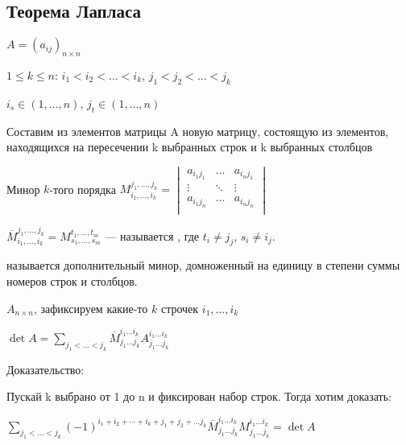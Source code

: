 \subsection{Теорема Лапласа}

\(A =(a_{ij})_{n \times n}\)

\(1 \leq k \leq n\): \(i_1 < i_2 < \ldots < i_k\), \(j_1 < j_2 < \ldots < j_k\)

\(i_s \in (1, \ldots, n)\), \(j_t \in (1, \ldots, n)\)

Составим из элементов матрицы A новую матрицу, состоящую из элементов, находящихся на пересечении k выбранных строк и k выбранных столбцов

Минор \(k\)-того порядка \(M_{i_1, \ldots, i_k}^{j_1, \ldots, j_k} =
\begin{vmatrix}
    a_{i_1 j_1} & \ldots & a_{i_n j_1} \\
    \vdots      & \ddots & \vdots      \\
    a_{i_1 j_n} & \ldots & a_{i_n j_n} \\
\end{vmatrix}\)

\(\overline{M}_{i_1, \ldots, i_k}^{j_1, \ldots, j_k} = M_{s_1, \ldots, s_m}^{t_1, \ldots, t_m}\) --- называется , где $t_i \neq j_j$, $s_i\neq i_j$.

 называется дополнительный минор, домноженный на единицу в степени суммы номеров строк и столбцов.


\(A_{n\times n }\), зафиксируем какие-то $k$ строчек $i_1,\ldots, i_k$

\(\det A = \sum\limits_{j_1<\ldots<j_k} \overline{M}_{j_1\ldots j_k}^{i_1\ldots i_k} A_{j_1\ldots j_k}^{i_1\ldots i_k}\)

Доказательство:

Пускай k выбрано от 1 до n и фиксирован набор строк. Тогда хотим доказать:

\(\sum\limits_{j_1<\ldots<j_k}(-1)^{i_1+i_2+ \cdots +i_k+ j_1 +j_2 + \ldots j_k} \overline{M}_{j_1\ldots j_k}^{i_1\ldots i_k} M_{j_1\ldots j_k}^{i_1\ldots i_k} = \det A\)

